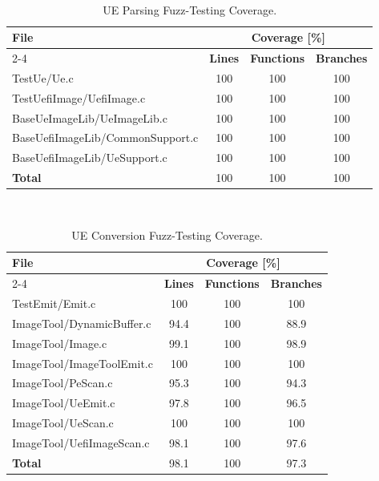 \begin{table}[!h]
  \centering
  \caption{UE Parsing Fuzz-Testing Coverage.}
  \hfill\\
  \begin{tabular}{l c c c}
    \toprule
    \multirow{2}{*}[-2pt]{\textbf{File}} & \multicolumn{3}{c}{\textbf{Coverage} [\%]}\\
    \cmidrule{2-4}
    & \textbf{Lines} & \textbf{Functions} & \textbf{Branches}\\
    \midrule
    TestUe/Ue.c & 100 & 100 & 100\\
    TestUefiImage/UefiImage.c & 100 & 100 & 100\\
    BaseUeImageLib/UeImageLib.c & 100 & 100 & 100\\
    BaseUefiImageLib/CommonSupport.c & 100 & 100 & 100\\
    BaseUefiImageLib/UeSupport.c & 100 & 100 & 100\\
    \midrule
    \textbf{Total} & 100 & 100 & 100\\
    \bottomrule
  \end{tabular}
\end{table}

\begin{table}[!h]
  \centering
  \caption{UE Conversion Fuzz-Testing Coverage.}
  \hfill\\
  \begin{tabular}{l c c c}
    \toprule
    \multirow{2}{*}[-2pt]{\textbf{File}} & \multicolumn{3}{c}{\textbf{Coverage} [\%]}\\
    \cmidrule{2-4}
    & \textbf{Lines} & \textbf{Functions} & \textbf{Branches}\\
    \midrule
    TestEmit/Emit.c & 100 & 100 & 100\\
    ImageTool/DynamicBuffer.c & 94.4 & 100 & 88.9\\
    ImageTool/Image.c & 99.1 & 100 & 98.9\\
    ImageTool/ImageToolEmit.c & 100 & 100 & 100\\
    ImageTool/PeScan.c & 95.3 & 100 & 94.3\\
    ImageTool/UeEmit.c & 97.8 & 100 & 96.5\\
    ImageTool/UeScan.c & 100 & 100 & 100\\
    ImageTool/UefiImageScan.c & 98.1 & 100 & 97.6\\
    \midrule
    \textbf{Total} & 98.1 & 100 & 97.3\\
    \bottomrule
  \end{tabular}
\end{table}

